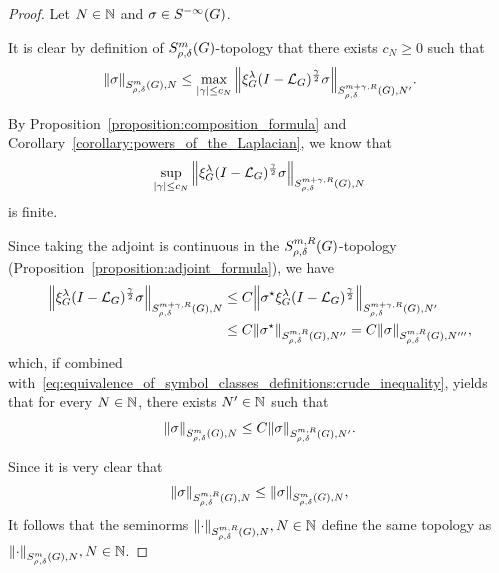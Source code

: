 \begin{proof}
    Let $N \in \mathbb{N}$ and $\sigma \in {S^{-\infty} (G)}$.

    It is clear by definition of $S^{m}_{\rho, \delta}(G)$-topology
    that there exists $c_N \geq 0$ such that
    \begin{align}
        {\left\| \sigma \right\|}_{S^{m}_{\rho, \delta}(G), N}
        \leq \max_{\left|{\gamma}\right| \leq c_{N}} {\left\| \xi^{\lambda}_{G} (I - {\mathcal{L}_{G}})^\frac{\gamma}{2} \sigma \right\|}_{S^{m + \gamma, R}_{\rho, \delta}(G), N'}.
        \label{eq:equivalence_of_symbol_classes_definitions:crude_inequality}
    \end{align}

    By Proposition~\ref{proposition:composition_formula} and Corollary~\ref{corollary:powers_of_the_Laplacian},
    we know that
    \begin{align*}
        \sup_{\left|{\gamma}\right| \leq c_N} {\left\| \xi^{\lambda}_{G} (I - {\mathcal{L}_{G}})^\frac{\gamma}{2} \sigma \right\|}_{S^{m + \gamma, R}_{\rho, \delta}(G), N}
    \end{align*}
    is finite.

    Since taking the adjoint is continuous in the $S^{m, R}_{\rho, \delta}(G)$-topology (Proposition~\ref{proposition:adjoint_formula}),
    we have
    \begin{align*}
        {\left\| \xi^{\lambda}_{G} (I - {\mathcal{L}_{G}})^\frac{\gamma}{2} \sigma \right\|}_{S^{m + \gamma, R}_{\rho, \delta}(G), N}
        &\leq C
        {\left\| {\sigma}^\star \xi^{\lambda}_{G} (I - {\mathcal{L}_{G}})^\frac{\gamma}{2} \right\|}_{S^{m + \gamma, R}_{\rho, \delta}(G), N'}\\
        &\leq C
        {\left\| {\sigma}^\star \right\|}_{S^{m, R}_{\rho, \delta}(G), N''}
        = C {\left\| \sigma \right\|}_{S^{m, R}_{\rho, \delta}(G), N'''},
    \end{align*}
    which,
    if combined with~\eqref{eq:equivalence_of_symbol_classes_definitions:crude_inequality},
    yields that for every $N \in \mathbb{N}$,
    there exists $N' \in \mathbb{N}$ such that
    \begin{align*}
        {\left\| \sigma \right\|}_{S^{m}_{\rho, \delta}(G), N}
        \leq C {\left\| \sigma \right\|}_{S^{m, R}_{\rho, \delta}(G), N'}.
    \end{align*}

    Since it is very clear that
    \begin{align*}
        {\left\| \sigma \right\|}_{S^{m, R}_{\rho, \delta}(G), N}
        \leq {\left\| \sigma \right\|}_{S^{m}_{\rho, \delta}(G), N},
    \end{align*}
    It follows that the seminorms ${\left\| \cdot \right\|}_{S^{m, R}_{\rho, \delta}(G), N}, N \in \mathbb{N}$ define the same topology as ${\left\| \cdot \right\|}_{S^{m}_{\rho, \delta}(G), N}, N \in \mathbb{N}$.


\end{proof}
